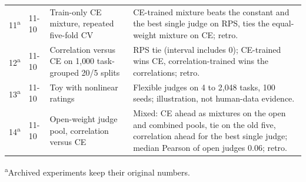 {\begin{longtable}{@{}p{}p{}p{}p{}@{}}
11\textsuperscript{a} & 11-10 & Train-only CE mixture, repeated five-fold CV & CE-trained mixture beats the constant and the best single judge on RPS, ties the equal-weight mixture on CE; retro. \\
12\textsuperscript{a} & 11-10 & Correlation versus CE on 1{,}000 task-grouped 20/5 splits & RPS tie (interval includes 0); CE-trained wins CE, correlation-trained wins the correlations; retro. \\
13\textsuperscript{a} & 11-10 & Toy with nonlinear ratings & Flexible judges on 4 to 2{,}048 tasks, 100 seeds; illustration, not human-data evidence. \\
14\textsuperscript{a} & 11-10 & Open-weight judge pool, correlation versus CE & Mixed: CE ahead as mixtures on the open and combined pools, tie on the old five, correlation ahead for the best single judge; median Pearson of open judges $0.06$; retro. \\
\end{longtable}
}
\noindent\textsuperscript{a}Archived experiments keep their original numbers.
